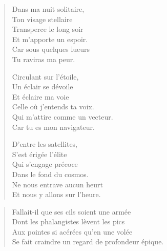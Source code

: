 \begin{verse}\sizain
  Dans ma nuit solitaire,\\ 
  Ton visage stellaire\\ 
  Transperce le long soir\\ 
  Et m’apporte un espoir.\\ 
  Car sous quelques lueurs\\ 
  Tu raviras ma peur.  %

  Circulant sur l’étoile,\\ 
  Un éclair se dévoile\\ 
  Et éclaire ma voie\\ 
  Celle où j’entends ta voix.\\ 
  Qui m’attire comme un vecteur.\\ 
  Car tu es mon navigateur.  %

  D’entre les satellites,\\ 
  S’est érigée l’élite\\ 
  Qui s’engage précoce\\ 
  Dans le fond du cosmos.\\ 
  Ne nous entrave aucun heurt\\ 
  Et nous y allons sur l’heure.  %
\end{verse}

\begin{verse}\quatrain
  Fallait-il que ses cils soient une armée\\ 
  Dont les phalangistes lèvent les pics\\ 
  Aux pointes si acérées qu’en une volée\\ 
  Se fait craindre un regard de profondeur épique.\\ 
\end{verse}

